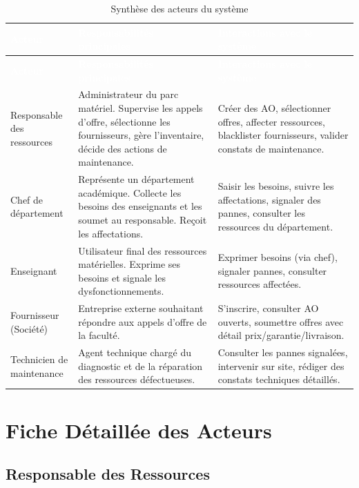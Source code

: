 \documentclass[12pt,a4paper]{report}
\begin{document}
\begin{longtable}{|L{3.5cm}|L{5.5cm}|L{5.5cm}|}
\caption{Synthèse des acteurs du système} \\
\hline
{}\textcolor{white}{\textbf{Acteur}} & \textcolor{white}{\textbf{Responsabilités principales}} & \textcolor{white}{\textbf{Interactions avec le système}} \\
\hline
\endfirsthead
\hline
{}\textcolor{white}{\textbf{Acteur}} & \textcolor{white}{\textbf{Responsabilités principales}} & \textcolor{white}{\textbf{Interactions avec le système}} \\
\hline
\endhead
Responsable des ressources &
Administrateur du parc matériel. Supervise les appels d'offre, sélectionne les fournisseurs, gère l'inventaire, décide des actions de maintenance. &
Créer des AO, sélectionner offres, affecter ressources, blacklister fournisseurs, valider constats de maintenance. \\
\hline
Chef de département &
Représente un département académique. Collecte les besoins des enseignants et les soumet au responsable. Reçoit les affectations. &
Saisir les besoins, suivre les affectations, signaler des pannes, consulter les ressources du département. \\
\hline
Enseignant &
Utilisateur final des ressources matérielles. Exprime ses besoins et signale les dysfonctionnements. &
Exprimer besoins (via chef), signaler pannes, consulter ressources affectées. \\
\hline
Fournisseur (Société) &
Entreprise externe souhaitant répondre aux appels d'offre de la faculté. &
S'inscrire, consulter AO ouverts, soumettre offres avec détail prix/garantie/livraison. \\
\hline
Technicien de maintenance &
Agent technique chargé du diagnostic et de la réparation des ressources défectueuses. &
Consulter les pannes signalées, intervenir sur site, rédiger des constats techniques détaillés. \\
\hline
\end{longtable}

\section{Fiche Détaillée des Acteurs}

\subsection{Responsable des Ressources}
\end{document}
